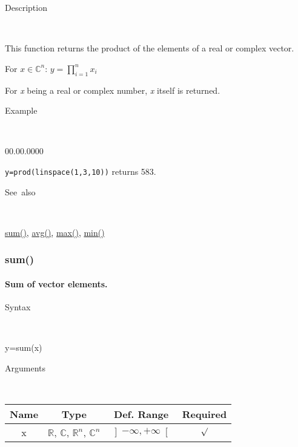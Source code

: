 \begin{description}
\item [Description]~
\end{description}
This function returns the product of the elements of a real or complex
vector.

\medskip{}
For $x\in$$\mathbb{C}^{n}$: $y=$$\prod\limits _{i=1}^{n}x_{i}$
\medskip{}

For \textit{x} being a real or complex number, \textit{x} itself is
returned.

\begin{description}
\item [Example]~
\end{description}
\begin{lyxlist}{00.00.0000}
\item [\texttt{y=prod(linspace(1,3,10))}]returns 583.
\end{lyxlist}
\begin{description}
\item [See~also]~
\end{description}
\textcolor{blue}{\hyperlink{sum}{sum()}}\textcolor{black}{,} \textcolor{blue}{\hyperlink{avg}{avg()}}\textcolor{black}{,}
\textcolor{blue}{\hyperlink{max}{max()}}\textcolor{black}{,} \textcolor{blue}{\hyperlink{min}{min()}}


\newpage
\subsubsection*{\hypertarget{sum}{}{\Large sum()}}


\paragraph{\label{par:Sum}Sum of vector elements.}

\begin{description}
\item [Syntax]~
\end{description}
y=sum(x)

\begin{description}
\item [Arguments]~
\end{description}
\begin{tabular}{|c|c|c|c|}
\hline 
Name&
Type&
Def. Range&
Required\tabularnewline
\hline
\hline 
x&
$\mathbb{R}$, $\mathbb{C}$, $\mathbb{R}^{n}$, $\mathbb{C}^{n}$&
$\left]-\infty,+\infty\right[$&
$\surd$\tabularnewline
\hline
\end{tabular}

